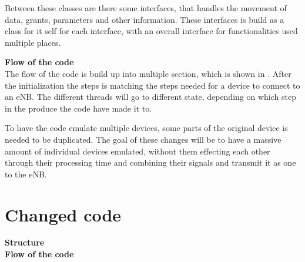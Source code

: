 Between these classes are there some interfaces, that handles the movement of data, grants, parameters and other information. These interfaces is build as a class for it self for each interface, with an overall interface for functionalities used multiple places.

\textbf{Flow of the code}\\
The flow of the code is build up into multiple section, which is shown in . After the initialization the steps is matching the steps needed for a device to connect to an eNB. The different threads will go to different state, depending on which step in the produce the code have made it to.



To have the code emulate multiple devices, some parts of the original device is needed to be duplicated. The goal of these changes will be to have a massive amount of individual devices emulated, without them effecting each other through their processing time and combining their signals and transmit it as one to the eNB.

\section{Changed code}

\textbf{Structure}\\
\textbf{Flow of the code}\\